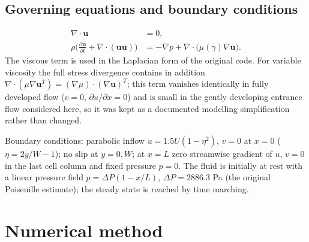 \subsection{Governing equations and boundary conditions}
\begin{align}
\nabla\cdot\mathbf{u}&=0,\\
\rho\Big(\frac{\partial\mathbf{u}}{\partial t}+\nabla\cdot(\mathbf{u}\mathbf{u})\Big)&=-\nabla p+\nabla\cdot\big(\mu(\dot\gamma)\nabla\mathbf{u}\big). \label{eq:mom}
\end{align}
The viscous term is used in the Laplacian form of the original code. For variable viscosity the full stress divergence contains in addition $\nabla\cdot(\mu\nabla\mathbf{u}^T)=(\nabla\mu)\cdot(\nabla\mathbf{u})^T$; this term vanishes identically in fully developed flow ($v=0$, $\partial u/\partial x=0$) and is small in the gently developing entrance flow considered here, so it was kept as a documented modelling simplification rather than changed.

Boundary conditions: parabolic inflow $u=1.5U(1-\eta^2)$, $v=0$ at $x=0$ ($\eta=2y/W-1$); no slip at $y=0,W$; at $x=L$ zero streamwise gradient of $u$, $v=0$ in the last cell column and fixed pressure $p=0$. The fluid is initially at rest with a linear pressure field $p=\Delta P(1-x/L)$, $\Delta P=2886.3$ Pa (the original Poiseuille estimate); the steady state is reached by time marching.

\section{Numerical method}

